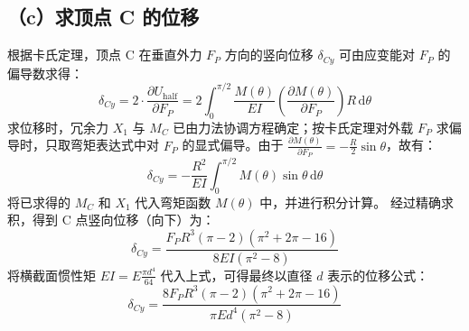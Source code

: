 \documentclass[UTF8,fontset=windows]{ctexart}
\newcommand{\diff}{\,\mathrm{d}}
\begin{document}
\subsection*{（c）求顶点 C 的位移}

根据卡氏定理，顶点 C 在垂直外力 $F_P$ 方向的竖向位移 $\delta_{Cy}$ 可由应变能对 $F_P$ 的偏导数求得：
\[
    \delta_{Cy} = 2 \cdot \frac{\partial U_{\text{half}}}{\partial F_P} = 2 \int_{0}^{\pi/2} \frac{M(\theta)}{EI} \left( \frac{\partial M(\theta)}{\partial F_P} \right) R \diff \theta
\]
求位移时，冗余力 $X_1$ 与 $M_C$ 已由力法协调方程确定；按卡氏定理对外载 $F_P$ 求偏导时，只取弯矩表达式中对 $F_P$ 的显式偏导。由于 $\frac{\partial M(\theta)}{\partial F_P} = -\frac{R}{2} \sin\theta$，故有：
\[
    \delta_{Cy} = -\frac{R^2}{EI} \int_{0}^{\pi/2} M(\theta) \sin\theta \diff \theta
\]
将已求得的 $M_C$ 和 $X_1$ 代入弯矩函数 $M(\theta)$ 中，并进行积分计算。
经过精确求积，得到 C 点竖向位移（向下）为：
\[
    \delta_{Cy} = \frac{F_P R^3 (\pi - 2) (\pi^2 + 2\pi - 16)}{8EI (\pi^2 - 8)}
\]
将横截面惯性矩 $EI = E \frac{\pi d^4}{64}$ 代入上式，可得最终以直径 $d$ 表示的位移公式：
\[
    \delta_{Cy} = \frac{8 F_P R^3 (\pi - 2) (\pi^2 + 2\pi - 16)}{\pi E d^4 (\pi^2 - 8)}
\]
\end{document}
